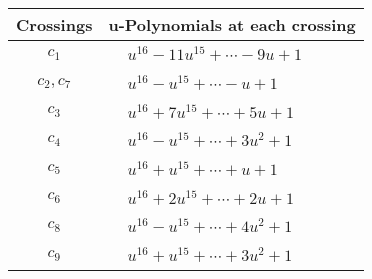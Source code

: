 \documentclass[1p]{elsarticle_modified}
\theoremstyle{definition}
\begin{document}
\begin{tabular}{m{50pt}|m{274pt}}
Crossings & \hspace{64pt}u-Polynomials at each crossing \\
\hline $$\begin{aligned}c_{1}\end{aligned}$$&$\begin{aligned}
&u^{16}-11 u^{15}+\cdots-9 u+1
\end{aligned}$\\
\hline $$\begin{aligned}c_{2},c_{7}\end{aligned}$$&$\begin{aligned}
&u^{16}- u^{15}+\cdots- u+1
\end{aligned}$\\
\hline $$\begin{aligned}c_{3}\end{aligned}$$&$\begin{aligned}
&u^{16}+7 u^{15}+\cdots+5 u+1
\end{aligned}$\\
\hline $$\begin{aligned}c_{4}\end{aligned}$$&$\begin{aligned}
&u^{16}- u^{15}+\cdots+3 u^2+1
\end{aligned}$\\
\hline $$\begin{aligned}c_{5}\end{aligned}$$&$\begin{aligned}
&u^{16}+u^{15}+\cdots+u+1
\end{aligned}$\\
\hline $$\begin{aligned}c_{6}\end{aligned}$$&$\begin{aligned}
&u^{16}+2 u^{15}+\cdots+2 u+1
\end{aligned}$\\
\hline $$\begin{aligned}c_{8}\end{aligned}$$&$\begin{aligned}
&u^{16}- u^{15}+\cdots+4 u^2+1
\end{aligned}$\\
\hline $$\begin{aligned}c_{9}\end{aligned}$$&$\begin{aligned}
&u^{16}+u^{15}+\cdots+3 u^2+1
\end{aligned}$\\

\end{tabular}
\end{document}
